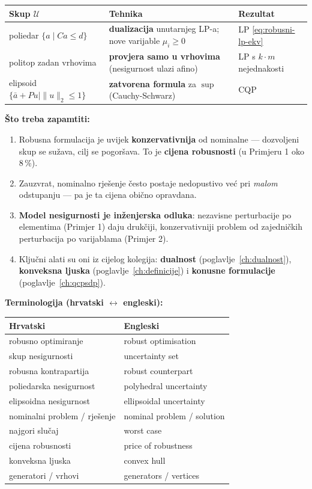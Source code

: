 \begin{center}
\begin{tabular}{P{3.6cm}P{4.4cm}P{4.6cm}}
\toprule
\textbf{Skup $\mathcal{U}$} & \textbf{Tehnika} & \textbf{Rezultat} \\
\midrule
poliedar $\{a \mid Ca \le d\}$
  & \textbf{dualizacija} unutarnjeg LP-a; nove varijable $\mu_i \ge 0$
  & LP \eqref{eq:robusni-lp-ekv} \\
politop zadan vrhovima
  & \textbf{provjera samo u vrhovima} (nesigurnost ulazi afino)
  & LP s $k\cdot m$ nejednakosti \\
elipsoid $\{\bar a + Pu \mid \|u\|_2\le1\}$
  & \textbf{zatvorena formula} za $\sup$ (Cauchy-Schwarz)
  & CQP \\
\bottomrule
\end{tabular}
\end{center}

\textbf{Što treba zapamtiti:}

\begin{enumerate}
  \item Robusna formulacija je uvijek \textbf{konzervativnija} od nominalne ---
        dozvoljeni skup se sužava, cilj se pogoršava. To je \textbf{cijena
        robusnosti} (u Primjeru 1 oko $8\,\%$).
  \item Zauzvrat, nominalno rješenje često postaje nedopustivo već pri
        \emph{malom} odstupanju --- pa je ta cijena obično opravdana.
  \item \textbf{Model nesigurnosti je inženjerska odluka}: nezavisne
        perturbacije po elementima (Primjer 1) daju drukčiji, konzervativniji
        problem od zajedničkih perturbacija po varijablama (Primjer 2).
  \item Ključni alati su oni iz cijelog kolegija: \textbf{dualnost}
        (poglavlje~\ref{ch:dualnost}), \textbf{konveksna ljuska}
        (poglavlje~\ref{ch:definicije}) i \textbf{konusne formulacije}
        (poglavlje~\ref{ch:qcpsdp}).
\end{enumerate}

\textbf{Terminologija (hrvatski $\leftrightarrow$ engleski):}

\begin{center}
\begin{tabular}{ll}
\toprule
\textbf{Hrvatski} & \textbf{Engleski} \\
\midrule
robusno optimiranje & robust optimisation \\
skup nesigurnosti & uncertainty set \\
robusna kontrapartija & robust counterpart \\
poliedarska nesigurnost & polyhedral uncertainty \\
elipsoidna nesigurnost & ellipsoidal uncertainty \\
nominalni problem / rješenje & nominal problem / solution \\
najgori slučaj & worst case \\
cijena robusnosti & price of robustness \\
konveksna ljuska & convex hull \\
generatori / vrhovi & generators / vertices \\
\bottomrule
\end{tabular}
\end{center}
